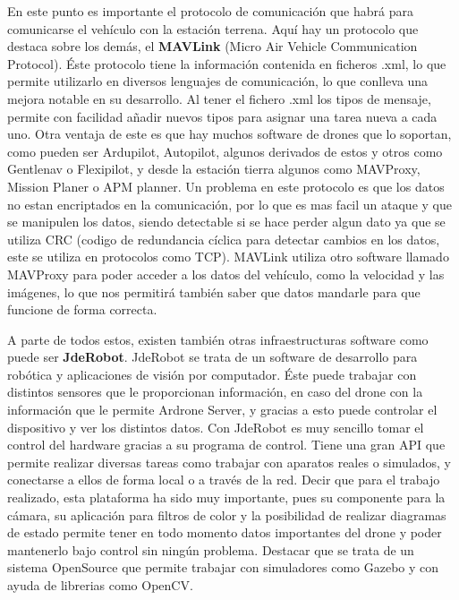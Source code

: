 \hspace{1 cm} En este punto es importante el protocolo de comunicaci\'on que habr\'a para comunicarse el veh\'iculo con la estaci\'on terrena. Aqu\'i hay un protocolo que destaca sobre los dem\'as, el \textbf{MAVLink} (Micro Air Vehicle Communication Protocol). \'Este protocolo tiene la informaci\'on contenida en ficheros .xml, lo que permite utilizarlo en diversos lenguajes de comunicaci\'on, lo que conlleva una mejora notable en su desarrollo. Al tener el fichero .xml los tipos de mensaje, permite con facilidad añadir nuevos tipos para asignar una tarea nueva a cada uno. Otra ventaja de este es que hay muchos software de drones que lo soportan, como pueden ser Ardupilot, Autopilot, algunos derivados de estos y otros como Gentlenav o Flexipilot, y desde la estaci\'on tierra algunos como MAVProxy, Mission Planer o APM planner. 
Un problema en este protocolo es que los datos no estan encriptados en la comunicaci\'on, por lo que es mas facil un ataque y que se manipulen los datos, siendo detectable si se hace perder algun dato ya que se utiliza CRC (codigo de redundancia c\'iclica para detectar cambios en los datos, este se utiliza en protocolos como TCP).
MAVLink utiliza otro software llamado MAVProxy para poder acceder a los datos del veh\'iculo, como la velocidad y las im\'agenes, lo que nos permitir\'a tambi\'en saber que datos mandarle para que funcione de forma correcta. 

\hspace{1 cm} A parte de todos estos, existen tambi\'en otras infraestructuras software como puede ser \textbf{JdeRobot}. JdeRobot se trata de un software de desarrollo para rob\'otica y aplicaciones de visi\'on por computador. \'Este puede trabajar con distintos sensores que le proporcionan informaci\'on, en caso del drone con la informaci\'on que le permite Ardrone Server, y gracias a esto puede controlar el dispositivo y ver los distintos datos. Con JdeRobot es muy sencillo tomar el control del hardware gracias a su programa de control. Tiene una gran API que permite realizar diversas tareas como trabajar con aparatos reales o simulados, y conectarse a ellos de forma local o a trav\'es de la red. Decir que para el trabajo realizado, esta plataforma ha sido muy importante, pues su componente para la c\'amara, su aplicaci\'on para filtros de color y la posibilidad de realizar diagramas de estado permite tener en todo momento datos importantes del drone y poder mantenerlo bajo control sin ning\'un problema. Destacar que se trata de un sistema OpenSource que permite trabajar con simuladores como Gazebo y con ayuda de librerias como OpenCV. 
 



